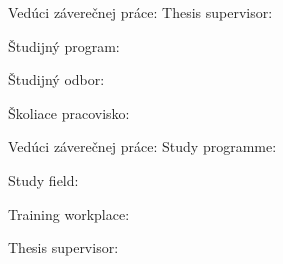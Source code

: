 

\ifx\FIITlagEN\undefined
Vedúci záverečnej práce: \FIITsupervisor
\else
Thesis supervisor: \FIITsupervisor
\fi

\medskip{}

\ifx\FIITlagEN\undefined
\FIITdateSK
\else
\FIITdate
\fi

\emptypage







\ifx\FIITlagEN\undefined
Študijný program: \FIITstudyProgramSK

Študijný odbor: \FIITdegreeCourseSK

Školiace pracovisko: \FIITinstituteSK

Vedúci záverečnej práce: \FIITsupervisor
\else
Study programme: \FIITstudyProgram

Study field: \FIITstudyField

Training workplace: \FIITinstitute

Thesis supervisor: \FIITsupervisor
\fi

\medskip{}

\ifx\FIITlagEN\undefined
\FIITdateSK
\else
\FIITdate
\fi

\emptypage
